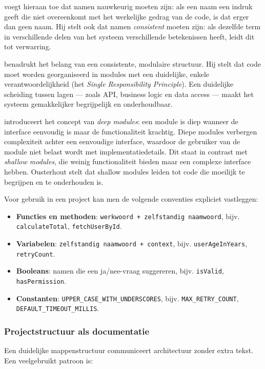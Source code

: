 \textcite{ousterhout2018philosophy} voegt hieraan toe dat namen nauwkeurig moeten zijn: als een naam een indruk geeft die niet overeenkomt met het werkelijke gedrag van de code, is dat erger dan geen naam. Hij stelt ook dat namen \textit{consistent} moeten zijn: als dezelfde term in verschillende delen van het systeem verschillende betekenissen heeft, leidt dit tot verwarring.

\textcite{martin2008clean} benadrukt het belang van een consistente, modulaire structuur. Hij stelt dat code moet worden georganiseerd in modules met een duidelijke, enkele verantwoordelijkheid (het \textit{Single Responsibility Principle}). Een duidelijke scheiding tussen lagen --- zoals API, business logic en data access --- maakt het systeem gemakkelijker begrijpelijk en onderhoudbaar.

\textcite{ousterhout2018philosophy} introduceert het concept van \textit{deep modules}: een module is diep wanneer de interface eenvoudig is maar de functionaliteit krachtig. Diepe modules verbergen complexiteit achter een eenvoudige interface, waardoor de gebruiker van de module niet belast wordt met implementatiedetails. Dit staat in contrast met \textit{shallow modules}, die weinig functionaliteit bieden maar een complexe interface hebben. Ousterhout stelt dat shallow modules leiden tot code die moeilijk te begrijpen en te onderhouden is.

Voor gebruik in een project kan men de volgende conventies expliciet vastleggen:

\begin{itemize}
    \item \textbf{Functies en methoden}: \texttt{werkwoord + zelfstandig naamwoord}, bijv. \texttt{calculateTotal}, \texttt{fetchUserById}.
    \item \textbf{Variabelen}: \texttt{zelfstandig naamwoord + context}, bijv. \texttt{userAgeInYears}, \texttt{retryCount}.
    \item \textbf{Booleans}: namen die een ja/nee-vraag suggereren, bijv. \texttt{isValid}, \texttt{hasPermission}.
    \item \textbf{Constanten}: \texttt{UPPER\_CASE\_WITH\_UNDERSCORES}, bijv. \texttt{MAX\_RETRY\_COUNT}, \texttt{DEFAULT\_TIMEOUT\_MILLIS}.
\end{itemize}

\subsubsection{Projectstructuur als documentatie}
Een duidelijke mappenstructuur communiceert architectuur zonder extra tekst. Een veelgebruikt patroon is:

